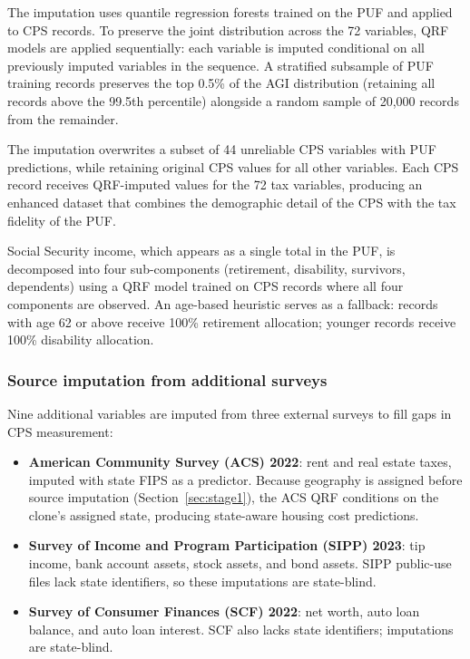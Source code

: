 The imputation uses quantile regression forests \citep[QRF;][]{meinshausen2006quantile} trained on the PUF and applied to CPS records. To preserve the joint distribution across the 72 variables, QRF models are applied sequentially: each variable is imputed conditional on all previously imputed variables in the sequence. A stratified subsample of PUF training records preserves the top 0.5\% of the AGI distribution (retaining all records above the 99.5th percentile) alongside a random sample of 20,000 records from the remainder.

The imputation overwrites a subset of 44 unreliable CPS variables with PUF predictions, while retaining original CPS values for all other variables. Each CPS record receives QRF-imputed values for the 72 tax variables, producing an enhanced dataset that combines the demographic detail of the CPS with the tax fidelity of the PUF.

Social Security income, which appears as a single total in the PUF, is decomposed into four sub-components (retirement, disability, survivors, dependents) using a QRF model trained on CPS records where all four components are observed. An age-based heuristic serves as a fallback: records with age 62 or above receive 100\% retirement allocation; younger records receive 100\% disability allocation.

\subsubsection{Source imputation from additional surveys}

Nine additional variables are imputed from three external surveys to fill gaps in CPS measurement:

\begin{itemize}
    \item \textbf{American Community Survey (ACS) 2022}: rent and real estate taxes, imputed with state FIPS as a predictor. Because geography is assigned before source imputation (Section~\ref{sec:stage1}), the ACS QRF conditions on the clone's assigned state, producing state-aware housing cost predictions.
    \item \textbf{Survey of Income and Program Participation (SIPP) 2023}: tip income, bank account assets, stock assets, and bond assets. SIPP public-use files lack state identifiers, so these imputations are state-blind.
    \item \textbf{Survey of Consumer Finances (SCF) 2022}: net worth, auto loan balance, and auto loan interest. SCF also lacks state identifiers; imputations are state-blind.
\end{itemize}

